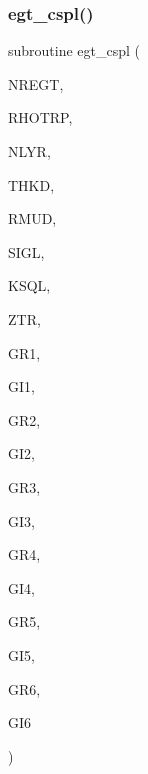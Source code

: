 \subsubsection{\texorpdfstring{egt\+\_\+cspl()}{egt\_cspl()}}
{\footnotesize\ttfamily subroutine egt\+\_\+cspl (\begin{DoxyParamCaption}\item[{integer}]{N\+R\+E\+GT,  }\item[{real, dimension(nregt)}]{R\+H\+O\+T\+RP,  }\item[{integer}]{N\+L\+YR,  }\item[{real (kind=ql), dimension(nlyr)}]{T\+H\+KD,  }\item[{real (kind=ql), dimension(0\+:nlyr)}]{R\+M\+UD,  }\item[{complex(kind=ql), dimension(nlyr)}]{S\+I\+GL,  }\item[{complex(kind=ql), dimension(nlyr)}]{K\+S\+QL,  }\item[{real}]{Z\+TR,  }\item[{real, dimension (4,nregt)}]{G\+R1,  }\item[{real, dimension (4,nregt)}]{G\+I1,  }\item[{real, dimension (4,nregt)}]{G\+R2,  }\item[{real, dimension (4,nregt)}]{G\+I2,  }\item[{real, dimension (4,nregt)}]{G\+R3,  }\item[{real, dimension (4,nregt)}]{G\+I3,  }\item[{real, dimension (4,nregt)}]{G\+R4,  }\item[{real, dimension (4,nregt)}]{G\+I4,  }\item[{real, dimension (4,nregt)}]{G\+R5,  }\item[{real, dimension (4,nregt)}]{G\+I5,  }\item[{real, dimension (4,nregt)}]{G\+R6,  }\item[{real, dimension (4,nregt)}]{G\+I6 }\end{DoxyParamCaption})}

